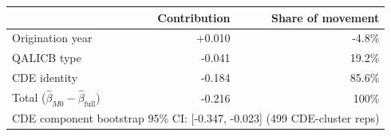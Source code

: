 \begin{tabular}{lrr}
\toprule
 & Contribution & Share of movement \\
\midrule
Origination year & +0.010 & -4.8\% \\
QALICB type & -0.041 & 19.2\% \\
CDE identity & -0.184 & 85.6\% \\
\midrule
Total ($\hat\beta_{M0} - \hat\beta_{\mathrm{full}}$) & -0.216 & 100\% \\
\multicolumn{3}{l}{\footnotesize CDE component bootstrap 95\% CI: [-0.347, -0.023] (499 CDE-cluster reps)} \\
\bottomrule
\end{tabular}

